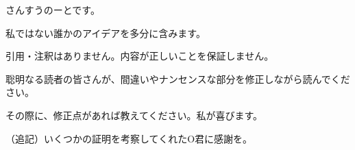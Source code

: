 
さんすうのーとです。

私ではない誰かのアイデアを多分に含みます。

引用・注釈はありません。内容が正しいことを保証しません。

聡明なる読者の皆さんが、間違いやナンセンスな部分を修正しながら読んでください。

その際に、修正点があれば教えてください。私が喜びます。

（追記）いくつかの証明を考察してくれたO君に感謝を。